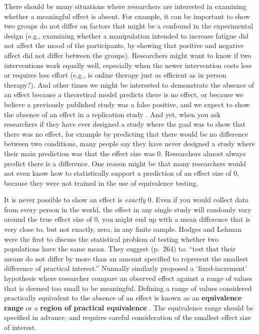 \documentclass[
  oneside]{book}
\begin{document}
There should be many situations where researchers are interested in examining whether a meaningful effect is absent. For example, it can be important to show two groups do not differ on factors that might be a confound in the experimental design (e.g., examining whether a manipulation intended to increase fatigue did not affect the mood of the participants, by showing that positive and negative affect did not differ between the groups). Researchers might want to know if two interventions work equally well, especially when the newer intervention costs less or requires less effort (e.g., is online therapy just as efficient as in person therapy?). And other times we might be interested to demonstrate the absence of an effect because a theoretical model predicts there is no effect, or because we believe a previously published study was a false positive, and we expect to show the absence of an effect in a replication study \citep{dienes_using_2014}. And yet, when you ask researchers if they have ever designed a study where the goal was to show that there was no effect, for example by predicting that there would be no difference between two conditions, many people say they have never designed a study where their main prediction was that the effect size was 0. Researchers almost always predict there is a difference. One reason might be that many researchers would not even know how to statistically support a prediction of an effect size of 0, because they were not trained in the use of equivalence testing.

It is never possible to show an effect is \emph{exactly} 0. Even if you would collect data from every person in the world, the effect in any single study will randomly vary around the true effect size of 0, you might end up with a mean difference that is very close to, but not exactly, zero, in any finite sample. Hodges and Lehman \citep{hodges_testing_1954} were the first to discuss the statistical problem of testing whether two populations have the same mean. They suggest (p.~264) to: ``test that their means do not differ by more than an amount specified to represent the smallest difference of practical interest.'' Nunnally \citep{nunnally_place_1960} similarly proposed a `fixed-increment' hypothesis where researcher compare an observed effect against a range of values that is deemed too small to be meaningful. Defining a range of values considered practically equivalent to the absence of an effect is known as an \textbf{equivalence range} \citep{bauer_unifying_1996} or a \textbf{region of practical equivalence} \citep{kruschke_bayesian_2013}. The equivalence range should be specified in advance, and requires careful consideration of the smallest effect size of interest.
\end{document}
